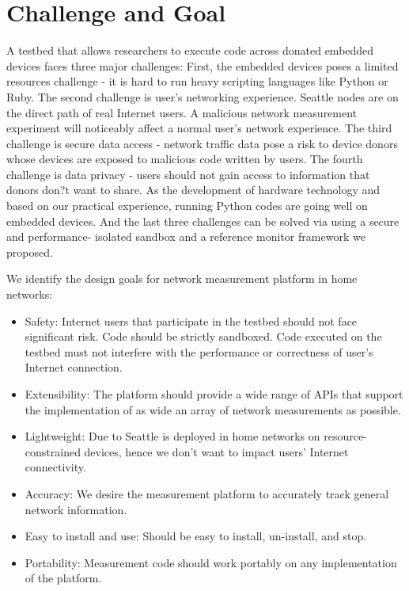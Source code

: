 \section{Challenge and Goal}
\label{sec.goal}
A testbed that allows researchers to execute code across donated embedded 
devices faces three major challenges: First, the embedded devices poses a 
limited resources challenge - it is hard to run heavy scripting languages 
like Python or Ruby. The second challenge is user's networking experience. 
Seattle nodes are on the direct path of real Internet users. A malicious 
network measurement experiment will noticeably affect a normal user's 
network experience. The third challenge is secure data access - network 
traffic data pose a risk to device donors whose devices are exposed to 
malicious code written by users. The fourth challenge is data privacy - 
users should not gain access to information that donors don?t want to share. 
As the development of hardware technology and based on our practical 
experience, running Python codes are going well on embedded devices. And the 
last three challenges can be solved via using a secure and performance-
isolated sandbox and a reference monitor framework we proposed.

We identify the design goals for network measurement platform in home 
networks:
\begin{itemize}
\item Safety: Internet users that participate in the testbed should not face 
significant risk. Code should be strictly sandboxed. Code executed on the 
testbed must not interfere with the performance or correctness of user's 
Internet connection.
\item Extensibility: The platform should provide a wide range of APIs that 
support the implementation of as wide an array of network measurements as 
possible.
\item Lightweight: Due to Seattle is deployed in home networks on resource-
constrained devices, hence we don't want to impact users' Internet 
connectivity.
\item Accuracy: We desire the measurement platform to accurately track 
general network information. 
\item Easy to install and use: Should be easy to install, un-install, and 
stop. 
\item Portability: Measurement code should work portably on any 
implementation of the platform.
\end{itemize}

